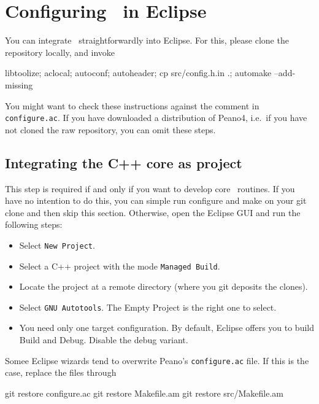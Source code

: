 \chapter{Configuring \Peano\ in Eclipse}


You can integrate \Peano\ straightforwardly into Eclipse. For this, please clone
the repository locally, and invoke

\begin{code}
libtoolize; aclocal; 
autoconf; autoheader; 
cp src/config.h.in .; 
automake --add-missing
\end{code}

\noindent
You might want to check these instructions against the comment in
\texttt{configure.ac}. If you have downloaded a distribution of Peano4,
i.e.~if you have not cloned the raw repository, you can omit these steps.


\section{Integrating the C++ core as project}

This step is required if and only if you want to develop core \Peano\ routines.
If you have no intention to do this, you can simple run configure and make on
your git clone and then skip this section. 
Otherwise, open the Eclipse GUI and run the following steps:

\begin{itemize}
  \item Select \texttt{New Project}.
  \item Select a C++ project with the mode \texttt{Managed Build}.
  \item Locate the project at a remote directory (where you git deposits the
  clones).
  \item Select \texttt{GNU Autotools}. The Empty Project is the right one to select.
  \item You need only one target configuration. By default, Eclipse offers you to build Build and Debug. Disable the debug variant.  
\end{itemize}

\noindent
Somee Eclipse wizards tend to overwrite Peano's \texttt{configure.ac} file. If
this is the case, replace the files through

\begin{code}
git restore  configure.ac
git restore  Makefile.am
git restore  src/Makefile.am
\end{code}

